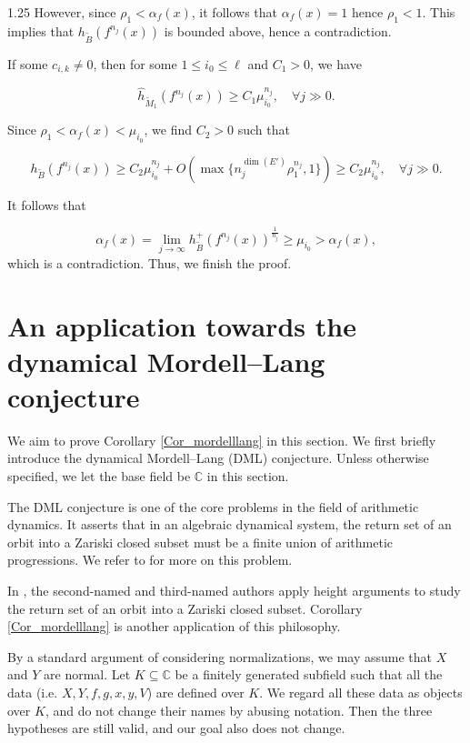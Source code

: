 \documentclass[12pt]{amsart}
\newcommand{\mb}[1]{\mathbb{#1}}
\newcommand\ra{\rightarrow}
\newcommand\wt{\widetilde}
\begin{document}
\begin{spacing}{1.25}
However, since $\rho_1<\alpha_f(x)$, it follows that $\alpha_f(x)=1$ hence $\rho_1<1$. This implies that $h_{\wt{B}}(f^{n_j}(x))$ is bounded above, hence a contradiction.

If some $c_{i,k}\neq 0$, then for some $1\leq i_0\leq \ell$ and $C_1>0$, we have

\[\widehat{h}_{\wt{M}_1}(f^{n_j}(x))\geq C_1\mu_{i_0}^{n_j},\quad \forall j\gg0.\]

 Since $\rho_1<\alpha_f(x)<\mu_{i_0}$, we find $C_2>0$ such that 

 \[h_{\wt{B}}(f^{n_j}(x))\geq C_2\mu_{i_0}^{n_j}+O(\max\{n_j^{\dim(E')}\rho_1^{n_j},1\})\geq C_2\mu_{i_0}^{n_j},\quad \forall j\gg0.\]

 It follows that

 \[\alpha_f(x)=\lim\limits_{j\ra\infty}h_{\wt{B}}^+(f^{n_j}(x))^{\frac{1}{n_j}}\geq\mu_{i_0}>\alpha_f(x),\]
 which is a contradiction. Thus, we finish the proof.
\endproof










\section{An application towards the dynamical Mordell--Lang conjecture}\label{Sec_app}

We aim to prove Corollary \ref{Cor_mordelllang} in this section. We first briefly introduce the dynamical Mordell--Lang (DML) conjecture. Unless otherwise specified, we let the base field be $\mb{C}$ in this section.

The DML conjecture is one of the core problems in the field of arithmetic dynamics. It asserts that in an algebraic dynamical system, the return set of an orbit into a Zariski closed subset must be a finite union of arithmetic progressions. We refer to \cite{BGT16,xieDML} for more on this problem.

In \cite{XY}, the second-named and third-named authors apply height arguments to study the return set of an orbit into a Zariski closed subset. Corollary \ref{Cor_mordelllang} is another application of this philosophy.

By a standard argument of considering normalizations, we may assume that $X$ and $Y$ are normal. Let $K\subseteq\mb{C}$ be a finitely generated subfield such that all the data (i.e. $X,Y,f,g,x,y,V$) are defined over $K$. We regard all these data as objects over $K$, and do not change their names by abusing notation. Then the three hypotheses are still valid, and our goal also does not change.


\end{spacing}
\end{document}
